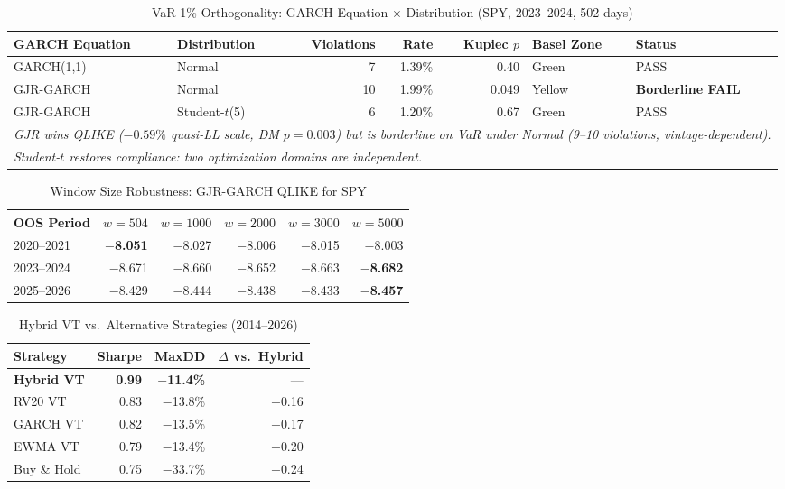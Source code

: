 
\begin{table}[H]
\centering
\caption{VaR 1\% Orthogonality: GARCH Equation $\times$ Distribution (SPY, 2023--2024, 502 days)}
\label{tab:var_ortho}
\begin{tabular}{llrrrll}
\toprule
GARCH Equation & Distribution & Violations & Rate & Kupiec $p$ & Basel Zone & Status \\
\midrule
GARCH(1,1) & Normal        & 7  & 1.39\% & 0.40 & Green & PASS \\
GJR-GARCH  & Normal        & 10 & 1.99\% & 0.049 & Yellow & \textbf{Borderline FAIL} \\
GJR-GARCH  & Student-$t$(5) & 6  & 1.20\% & 0.67 & Green & PASS \\
\midrule
\multicolumn{7}{l}{\textit{GJR wins QLIKE ($-0.59\%$ quasi-LL scale, DM $p = 0.003$) but is borderline on VaR under Normal (9--10 violations, vintage-dependent).}} \\
\multicolumn{7}{l}{\textit{Student-$t$ restores compliance: two optimization domains are independent.}} \\
\bottomrule
\end{tabular}
\end{table}

\begin{table}[H]
\centering
\caption{Window Size Robustness: GJR-GARCH QLIKE for SPY}
\label{tab:window}
\begin{tabular}{lrrrrr}
\toprule
OOS Period & $w=504$ & $w=1000$ & $w=2000$ & $w=3000$ & $w=5000$ \\
\midrule
2020--2021 & \textbf{$-$8.051} & $-$8.027 & $-$8.006 & $-$8.015 & $-$8.003 \\
2023--2024 & $-$8.671 & $-$8.660 & $-$8.652 & $-$8.663 & \textbf{$-$8.682} \\
2025--2026 & $-$8.429 & $-$8.444 & $-$8.438 & $-$8.433 & \textbf{$-$8.457} \\
\bottomrule
\end{tabular}
\end{table}

\begin{table}[H]
\centering
\caption{Hybrid VT vs.\ Alternative Strategies (2014--2026)}
\label{tab:hybrid}
\begin{tabular}{lrrr}
\toprule
Strategy & Sharpe & MaxDD & $\Delta$ vs.\ Hybrid \\
\midrule
\textbf{Hybrid VT} & \textbf{0.99} & \textbf{$-$11.4\%} & --- \\
RV20 VT & 0.83 & $-$13.8\% & $-$0.16 \\
GARCH VT & 0.82 & $-$13.5\% & $-$0.17 \\
EWMA VT & 0.79 & $-$13.4\% & $-$0.20 \\
Buy \& Hold & 0.75 & $-$33.7\% & $-$0.24 \\
\bottomrule
\end{tabular}
\end{table}

